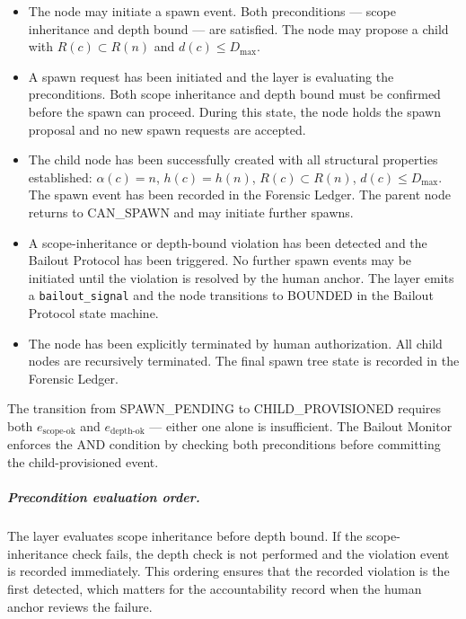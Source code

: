 \begin{itemize}\itemsep=0pt
\item[\textbf{CAN\_SPAWN.}] The node may initiate a spawn event. Both preconditions — scope inheritance and depth bound — are satisfied. The node may propose a child with $R(c) \subset R(n)$ and $d(c) \leq D_{\max}$.

\item[\textbf{SPAWN\_PENDING.}] A spawn request has been initiated and the \bounds{} layer is evaluating the preconditions. Both scope inheritance and depth bound must be confirmed before the spawn can proceed. During this state, the node holds the spawn proposal and no new spawn requests are accepted.

\item[\textbf{CHILD\_PROVISIONED.}] The child node has been successfully created with all structural properties established: $\alpha(c) = n$, $h(c) = h(n)$, $R(c) \subset R(n)$, $d(c) \leq D_{\max}$. The spawn event has been recorded in the Forensic Ledger. The parent node returns to CAN\_SPAWN and may initiate further spawns.

\item[\textbf{SPAWN\_LOCKED.}] A scope-inheritance or depth-bound violation has been detected and the Bailout Protocol has been triggered. No further spawn events may be initiated until the violation is resolved by the human anchor. The \bounds{} layer emits a \texttt{bailout\_signal} and the node transitions to BOUNDED in the Bailout Protocol state machine.

\item[\textbf{SPAWN\_TERMINATED.}] The node has been explicitly terminated by human authorization. All child nodes are recursively terminated. The final spawn tree state is recorded in the Forensic Ledger.
\end{itemize}

The transition from SPAWN\_PENDING to CHILD\_PROVISIONED requires both $e_{\text{scope-ok}}$ and $e_{\text{depth-ok}}$ — either one alone is insufficient. The Bailout Monitor enforces the AND condition by checking both preconditions before committing the child-provisioned event.

\subparagraph{Precondition evaluation order.} The \bounds{} layer evaluates scope inheritance before depth bound. If the scope-inheritance check fails, the depth check is not performed and the violation event is recorded immediately. This ordering ensures that the recorded violation is the first detected, which matters for the accountability record when the human anchor reviews the failure.


